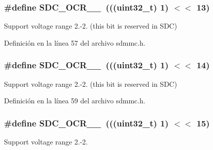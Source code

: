 \subsubsection[{\texorpdfstring{S\+D\+C\+\_\+\+O\+C\+R\+\_\+25\+\_\+26}{SDC_OCR_25_26}}]{\setlength{\rightskip}{0pt plus 5cm}\#define S\+D\+C\+\_\+\+O\+C\+R\+\_\+\_~(((uint32\+\_\+t) 1) $<$$<$ 13)}\hypertarget{group___c_h_i_p___s_d_m_m_c___definitions_ga6cac4e4e0b70df4e109de1dca8af1726}{}\label{group___c_h_i_p___s_d_m_m_c___definitions_ga6cac4e4e0b70df4e109de1dca8af1726}
Support voltage range 2.-\/2. (this bit is reserved in S\+DC) 

Definición en la línea 57 del archivo sdmmc.\+h.

\subsubsection[{\texorpdfstring{S\+D\+C\+\_\+\+O\+C\+R\+\_\+26\+\_\+27}{SDC_OCR_26_27}}]{\setlength{\rightskip}{0pt plus 5cm}\#define S\+D\+C\+\_\+\+O\+C\+R\+\_\+\_~(((uint32\+\_\+t) 1) $<$$<$ 14)}\hypertarget{group___c_h_i_p___s_d_m_m_c___definitions_ga1c71bab9362e057b2b3bb0bd515c0932}{}\label{group___c_h_i_p___s_d_m_m_c___definitions_ga1c71bab9362e057b2b3bb0bd515c0932}
Support voltage range 2.-\/2. (this bit is reserved in S\+DC) 

Definición en la línea 59 del archivo sdmmc.\+h.

\subsubsection[{\texorpdfstring{S\+D\+C\+\_\+\+O\+C\+R\+\_\+27\+\_\+28}{SDC_OCR_27_28}}]{\setlength{\rightskip}{0pt plus 5cm}\#define S\+D\+C\+\_\+\+O\+C\+R\+\_\+\_~(((uint32\+\_\+t) 1) $<$$<$ 15)}\hypertarget{group___c_h_i_p___s_d_m_m_c___definitions_ga3b86b17c962cfd53a506a5cdf66d6d80}{}\label{group___c_h_i_p___s_d_m_m_c___definitions_ga3b86b17c962cfd53a506a5cdf66d6d80}
Support voltage range 2.-\/2. 

